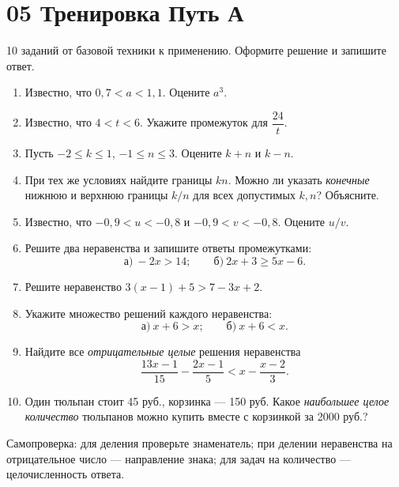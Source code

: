 \documentclass[a4paper,12pt]{article}
\begin{document}
\section*{05 \quad Тренировка \textemdash{} Путь А}
\textcolor{muted}{10 заданий от базовой техники к применению. Оформите решение и запишите ответ.}
\begin{enumerate}[label=\textbf{\arabic*.},itemsep=1.0em]
\item Известно, что $0{,}7<a<1{,}1$. Оцените $a^3$.
\item Известно, что $4<t<6$. Укажите промежуток для $\dfrac{24}{t}$.
\item Пусть $-2\le k\le1$, $-1\le n\le3$. Оцените $k+n$ и $k-n$.
\item При тех же условиях найдите границы $kn$. Можно ли указать \emph{конечные} нижнюю и верхнюю границы $k/n$ для всех допустимых $k,n$? Объясните.
\item Известно, что $-0{,}9<u<-0{,}8$ и $-0{,}9<v<-0{,}8$. Оцените $u/v$.
\item Решите два неравенства и запишите ответы промежутками:
\[
\text{а)}\ -2x>14;\qquad
\text{б)}\ 2x+3\ge5x-6.
\]
\item Решите неравенство $3(x-1)+5>7-3x+2$.
\item Укажите множество решений каждого неравенства:
\[
\text{а)}\ x+6>x;\qquad
\text{б)}\ x+6<x.
\]
\item Найдите все \emph{отрицательные целые} решения неравенства
\[
\frac{13x-1}{15}-\frac{2x-1}{5}<x-\frac{x-2}{3}.
\]
\item Один тюльпан стоит 45 руб., корзинка --- 150 руб. Какое \emph{наибольшее целое количество} тюльпанов можно купить вместе с корзинкой за 2000 руб.?
\end{enumerate}
\vfill
\textcolor{muted}{\small Самопроверка: для деления проверьте знаменатель; при делении неравенства на отрицательное число --- направление знака; для задач на количество --- целочисленность ответа.}
\clearpage
\end{document}
